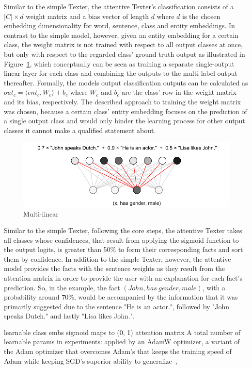 Similar to the simple Texter, the attentive Texter's classification consists of a $|C| \times d$ weight matrix and a bias vector of length $d$ where $d$ is the chosen embedding dimensionality for word, sentence, class and entity embeddings. In contrast to the simple model, however, given an entity embedding for a certain class, the weight matrix is not trained with respect to all output classes at once, but only with respect to the regarded class' ground truth output as illustrated in Figure~\ref{fig:4_approach/1_texter/2_attention_model/multi_linear}, which conceptually can be seen as training a separate single-output linear layer for each class and combining the outputs to the multi-label output thereafter. Formally, the models output classification outputs can be calculated as $out_c = \langle ent_c, W_c \rangle + b_c$ where $W_c$ and $b_c$ are the class' row in the weight matrix and its bias, respectively. The described approach to training the weight matrix was chosen, because a certain class' entity embedding focuses on the prediction of a single output class and would only hinder the learning process for other output classes it cannot make a qualified statement about.

\begin{figure}[t]
    \centering
    \includegraphics{4_approach/1_texter/2_attention_model/multi_linear}
    \caption{Multi-linear}
    \label{fig:4_approach/1_texter/2_attention_model/multi_linear}
\end{figure}

Similar to the simple Texter, following the core steps, the attentive Texter takes all classes whose confidences, that result from applying the sigmoid function to the output logits, is greater than 50\% to form their corresponding facts and sort them by confidence. In addition to the simple Texter, however, the attentive model provides the facts with the sentence weights as they result from the attention matrix in order to provide the user with an explanation for each fact's prediction. So, in the example, the fact $(John, has~gender, male)$, with a probability around 70\%, would be accompanied by the information that it was primarily suggested due to the sentence "He is an actor.", followed by "John speaks Dutch." and lastly "Lisa likes John.".

learnable class embs
sigmoid maps to (0, 1)
attention matrix A
total number of learnable params
in experiments: applied by an AdamW optimizer, a variant of the Adam optimizer that overcomes Adam's that keeps the training speed of Adam while keeping SGD's superior ability to generalize~, \cite{Loshchilov2019DecoupledWD}
